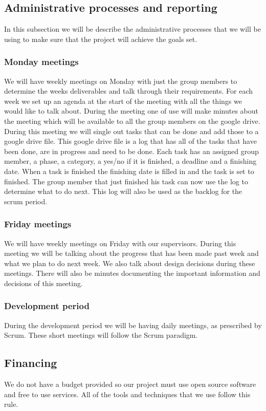 \subsection*{Administrative processes and reporting}
In this subsection we will be describe the administrative processes that we will be using to make sure that the project will achieve the goals set.
\subsubsection*{Monday meetings}
We will have weekly meetings on Monday with just the group members to determine the weeks deliverables and talk through their requirements.
For each week we set up an agenda at the start of the meeting with all the things we would like to talk about.
During the meeting one of use will make minutes about the meeting which will be available to all the group members on the google drive.
During this meeting we will single out tasks that can be done and add those to a google drive file.
This google drive file is a log that has all of the tasks that have been done, are in progress and need to be done.
Each task has an assigned group member, a phase, a category, a yes/no if it is finished, a deadline and a finishing date.
When a task is finished the finishing date is filled in and the task is set to finished. The group member that just finished his task can now use the log to determine what to do next.
This log will also be used as the backlog for the scrum period.
\subsubsection*{Friday meetings}
We will have weekly meetings on Friday with our supervisors.
During this meeting we will be talking about the progress that has been made past week and what we plan to do next week.
We also talk about design decisions during these meetings.
There will also be minutes documenting the important information and decisions of this meeting.
\subsubsection*{Development period}
During the development period we will be having daily meetings, as prescribed by Scrum.
These short meetings will follow the Scrum paradigm.

\subsection*{Financing}
We do not have a budget provided so our project must use open source software and free to use services.
All of the tools and techniques that we use follow this rule.

